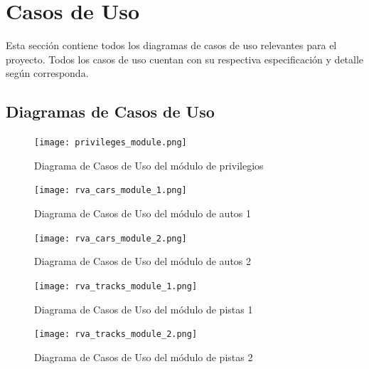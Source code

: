 \newpage

\section{Casos de Uso}
Esta sección contiene todos los diagramas de casos de uso relevantes para el proyecto. Todos los casos de uso cuentan con su respectiva especificación y detalle según corresponda.

\subsection{Diagramas de Casos de Uso}
\label{analysis:usecases}

\begin{figure}[H]
  \begin{center}
    \texttt{[image: privileges\_module.png]}
  \end{center}
  \caption[Diagrama de Casos de Uso del módulo de privilegios]{Diagrama de Casos de Uso del módulo de privilegios}
  \label{fig:privileges_module.png}
\end{figure}

\begin{figure}[H]
  \begin{center}
    \texttt{[image: rva\_cars\_module\_1.png]}
  \end{center}
  \caption[Diagrama de Casos de Uso del módulo de autos 1]{Diagrama de Casos de Uso del módulo de autos 1}
  \label{fig:rva_cars_module_1}
\end{figure}

\begin{figure}[H]
  \begin{center}
    \texttt{[image: rva\_cars\_module\_2.png]}
  \end{center}
  \caption[Diagrama de Casos de Uso del módulo de autos 2]{Diagrama de Casos de Uso del módulo de autos 2}
  \label{fig:rva_cars_module_2}
\end{figure}

\begin{figure}[H]
  \begin{center}
    \texttt{[image: rva\_tracks\_module\_1.png]}
  \end{center}
  \caption[Diagrama de Casos de Uso del módulo de pistas 1]{Diagrama de Casos de Uso del módulo de pistas 1}
  \label{fig:rva_tracks_module_1}
\end{figure}

\begin{figure}[H]
  \begin{center}
    \texttt{[image: rva\_tracks\_module\_2.png]}
  \end{center}
  \caption[Diagrama de Casos de Uso del módulo de pistas 2]{Diagrama de Casos de Uso del módulo de pistas 2}
  \label{fig:rva_tracks_module_2}
\end{figure}

